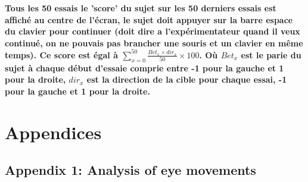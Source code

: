 \documentclass[12pt,english]{article}%
\begin{document}


\textbf{Tous les 50 essais le 'score' du sujet sur les 50 derniers essais est affiché au centre de l'écran, le sujet doit appuyer sur la barre espace du clavier pour continuer (doit dire a l'expérimentateur quand il veux continué, on ne pouvais pas brancher une souris et un clavier en même temps). Ce score est égal à $\sum_{x=0}^{50} \frac{Bet_{x} \times dir_x}{50} \times 100$. Où $Bet_x$ est le parie du sujet à chaque début d'essaie comprie entre -1 pour la gauche et 1 pour la droite, $dir_x$ est la direction de la cible pour chaque essai, -1 pour la gauche et 1 pour la droite.}


 

\section{Appendices}
\subsection{Appendix 1: Analysis of eye movements}
\label{app:em}
\end{document}
